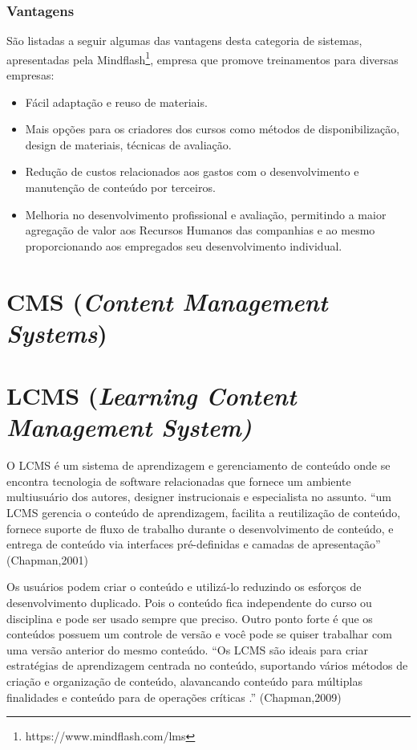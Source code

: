 \documentclass[12pt]{article}
\begin{document}
\subsubsection{Vantagens}

São listadas a seguir algumas das vantagens desta categoria de sistemas, apresentadas pela Mindflash\footnote{https://www.mindflash.com/lms}, 
empresa que promove treinamentos para diversas empresas:

\begin{itemize}
 \item Fácil adaptação e reuso de materiais.
 \item Mais opções para os criadores dos cursos como métodos de disponibilização, design de materiais, técnicas de avaliação.
 \item Redução de custos relacionados aos gastos com o desenvolvimento e manutenção de conteúdo por terceiros.
 \item Melhoria no desenvolvimento profissional e avaliação, permitindo a maior agregação de valor aos Recursos Humanos das companhias e ao mesmo 
 proporcionando aos empregados seu desenvolvimento individual.
\end{itemize}

\section{CMS (\textit{Content Management Systems})}

\section{LCMS (\textit{Learning Content Management System)}}

O LCMS é um sistema de aprendizagem e gerenciamento de conteúdo onde se encontra tecnologia de software relacionadas que fornece um ambiente 
multiusuário dos autores, designer instrucionais e especialista no assunto. “um LCMS gerencia o conteúdo de aprendizagem, facilita a reutilização 
de conteúdo, fornece suporte de fluxo de trabalho durante o desenvolvimento de conteúdo, e entrega de conteúdo via interfaces pré-definidas e 
camadas de apresentação” (Chapman,2001)

Os usuários podem criar o conteúdo e utilizá-lo reduzindo os esforços de desenvolvimento duplicado. Pois o conteúdo fica independente do curso 
ou disciplina e pode ser usado sempre que preciso. Outro ponto forte é que os conteúdos possuem um controle de versão e você pode se quiser 
trabalhar com uma versão anterior do mesmo conteúdo. “Os LCMS são ideais para criar estratégias de aprendizagem centrada no conteúdo, suportando 
vários métodos de criação e organização de conteúdo, alavancando conteúdo para múltiplas finalidades e conteúdo para de operações críticas .” 
(Chapman,2009)
\end{document}
